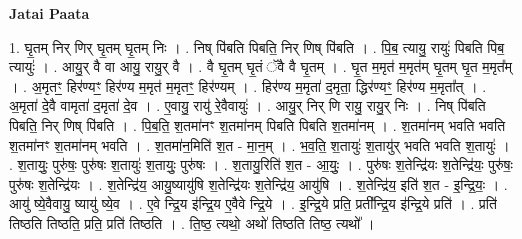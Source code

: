 \documentclass[17pt]{extarticle}
\begin{document}
\textbf{Jatai Paata} \newline

1. घृ॒तम् निर् णिर् घृ॒तम् घृ॒तम् निः । . निष् पि॑बति पिबति॒ निर् णिष् पि॑बति । . पि॒ब॒ त्यायु॒ रायुः॑ पिबति पिब॒ त्यायुः॑ । . आयु॒र् वै वा आयु॒ रायु॒र् वै । . वै घृ॒तम् घृ॒तं ॅवै वै घृ॒तम् । . घृ॒त म॒मृत॑ म॒मृत॑म् घृ॒तम् घृ॒त म॒मृत᳚म् । . अ॒मृतꣳ॒॒ हिर॑ण्यꣳ॒॒ हिर॑ण्य म॒मृत॑ म॒मृतꣳ॒॒ हिर॑ण्यम् । . हिर॑ण्य म॒मृता॑ द॒मृता॒ द्धिर॑ण्यꣳ॒॒ हिर॑ण्य म॒मृता᳚त् । . अ॒मृता॑ दे॒वै वामृता॑ द॒मृता॑ दे॒व । . ए॒वायु॒ रायु॑ रे॒वैवायुः॑ । . आयु॒र् निर् णि रायु॒ रायु॒र् निः । . निष् पि॑बति पिबति॒ निर् णिष् पि॑बति । . पि॒ब॒ति॒ श॒तमा॑नꣳ श॒तमा॑नम् पिबति पिबति श॒तमा॑नम् । . श॒तमा॑नम् भवति भवति श॒तमा॑नꣳ श॒तमा॑नम् भवति । . श॒तमा॑न॒मिति॑ श॒त - मा॒न॒म् । . भ॒व॒ति॒ श॒तायुः॑ श॒तायु॑र् भवति भवति श॒तायुः॑ । . श॒तायुः॒ पुरु॑षः॒ पुरु॑षः श॒तायुः॑ श॒तायुः॒ पुरु॑षः । . श॒तायु॒रिति॑ श॒त - आ॒युः॒ । . पुरु॑षः श॒तेन्द्रि॑यः श॒तेन्द्रि॑यः॒ पुरु॑षः॒ पुरु॑षः श॒तेन्द्रि॑यः । . श॒तेन्द्रि॑य॒ आयु॒ष्यायु॑षि श॒तेन्द्रि॑यः श॒तेन्द्रि॑य॒ आयु॑षि । . श॒तेन्द्रि॑य॒ इति॑ श॒त - इ॒न्द्रि॒यः॒ । . आयु॑ ष्ये॒वैवायु॒ ष्यायु॑ ष्ये॒व । . ए॒वे न्द्रि॒य इ॑न्द्रि॒य ए॒वैवे न्द्रि॒ये । . इ॒न्द्रि॒ये प्रति॒ प्रती᳚न्द्रि॒य इ॑न्द्रि॒ये प्रति॑ । . प्रति॑ तिष्ठति तिष्ठति॒ प्रति॒ प्रति॑ तिष्ठति । . ति॒ष्ठ॒ त्यथो॒ अथो॑ तिष्ठति तिष्ठ॒ त्यथो᳚ । \newline
\end{document}
